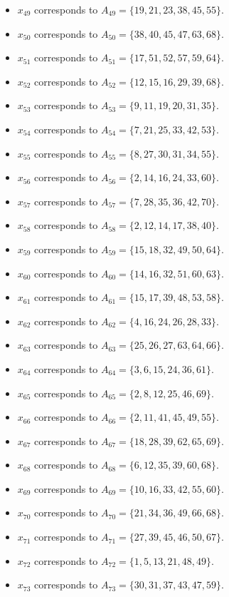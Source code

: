 \documentclass[11pt]{article}
\begin{document}
\begin{itemize}
\item $x_{49}$ corresponds to $A_{49}=\{19, 21, 23, 38, 45, 55\}$.
\item $x_{50}$ corresponds to $A_{50}=\{38, 40, 45, 47, 63, 68\}$.
\item $x_{51}$ corresponds to $A_{51}=\{17, 51, 52, 57, 59, 64\}$.
\item $x_{52}$ corresponds to $A_{52}=\{12, 15, 16, 29, 39, 68\}$.
\item $x_{53}$ corresponds to $A_{53}=\{9, 11, 19, 20, 31, 35\}$.
\item $x_{54}$ corresponds to $A_{54}=\{7, 21, 25, 33, 42, 53\}$.
\item $x_{55}$ corresponds to $A_{55}=\{8, 27, 30, 31, 34, 55\}$.
\item $x_{56}$ corresponds to $A_{56}=\{2, 14, 16, 24, 33, 60\}$.
\item $x_{57}$ corresponds to $A_{57}=\{7, 28, 35, 36, 42, 70\}$.
\item $x_{58}$ corresponds to $A_{58}=\{2, 12, 14, 17, 38, 40\}$.
\item $x_{59}$ corresponds to $A_{59}=\{15, 18, 32, 49, 50, 64\}$.
\item $x_{60}$ corresponds to $A_{60}=\{14, 16, 32, 51, 60, 63\}$.
\item $x_{61}$ corresponds to $A_{61}=\{15, 17, 39, 48, 53, 58\}$.
\item $x_{62}$ corresponds to $A_{62}=\{4, 16, 24, 26, 28, 33\}$.
\item $x_{63}$ corresponds to $A_{63}=\{25, 26, 27, 63, 64, 66\}$.
\item $x_{64}$ corresponds to $A_{64}=\{3, 6, 15, 24, 36, 61\}$.
\item $x_{65}$ corresponds to $A_{65}=\{2, 8, 12, 25, 46, 69\}$.
\item $x_{66}$ corresponds to $A_{66}=\{2, 11, 41, 45, 49, 55\}$.
\item $x_{67}$ corresponds to $A_{67}=\{18, 28, 39, 62, 65, 69\}$.
\item $x_{68}$ corresponds to $A_{68}=\{6, 12, 35, 39, 60, 68\}$.
\item $x_{69}$ corresponds to $A_{69}=\{10, 16, 33, 42, 55, 60\}$.
\item $x_{70}$ corresponds to $A_{70}=\{21, 34, 36, 49, 66, 68\}$.
\item $x_{71}$ corresponds to $A_{71}=\{27, 39, 45, 46, 50, 67\}$.
\item $x_{72}$ corresponds to $A_{72}=\{1, 5, 13, 21, 48, 49\}$.
\item $x_{73}$ corresponds to $A_{73}=\{30, 31, 37, 43, 47, 59\}$.

\end{itemize}
\end{document}
